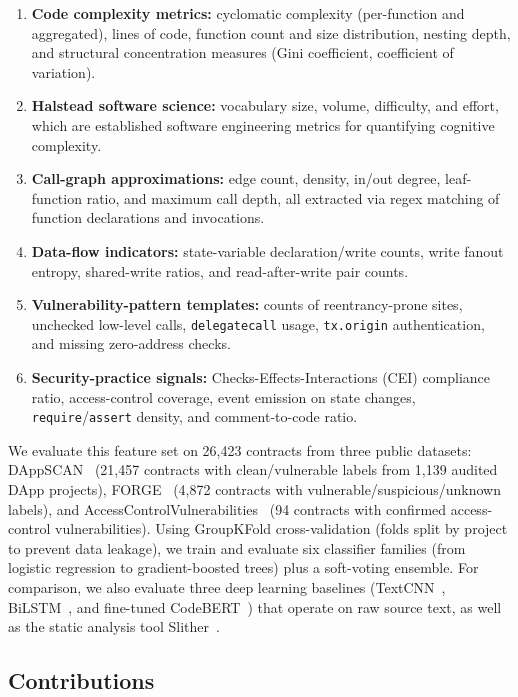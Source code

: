 \documentclass[11pt,a4paper]{article}
\begin{document}
\begin{enumerate}
    \item \textbf{Code complexity metrics:} cyclomatic complexity (per-function and aggregated), lines of code, function count and size distribution, nesting depth, and structural concentration measures (Gini coefficient, coefficient of variation).
    \item \textbf{Halstead software science:} vocabulary size, volume, difficulty, and effort, which are established software engineering metrics for quantifying cognitive complexity.
    \item \textbf{Call-graph approximations:} edge count, density, in/out degree, leaf-function ratio, and maximum call depth, all extracted via regex matching of function declarations and invocations.
    \item \textbf{Data-flow indicators:} state-variable declaration/write counts, write fanout entropy, shared-write ratios, and read-after-write pair counts.
    \item \textbf{Vulnerability-pattern templates:} counts of reentrancy-prone sites, unchecked low-level calls, \texttt{delegatecall} usage, \texttt{tx.origin} authentication, and missing zero-address checks.
    \item \textbf{Security-practice signals:} Checks-Effects-Interactions (CEI) compliance ratio, access-control coverage, event emission on state changes, \texttt{require}/\texttt{assert} density, and comment-to-code ratio.
\end{enumerate}

We evaluate this feature set on 26,423 contracts from three public datasets: DAppSCAN~\cite{wu2023dappscan} (21,457 contracts with clean/vulnerable labels from 1,139 audited DApp projects), FORGE~\cite{chen2025forge} (4,872 contracts with vulnerable/suspicious/unknown labels), and AccessControlVulnerabilities~\cite{liu2025acbenchmark} (94 contracts with confirmed access-control vulnerabilities).
Using GroupKFold cross-validation (folds split by project to prevent data leakage), we train and evaluate six classifier families (from logistic regression to gradient-boosted trees) plus a soft-voting ensemble.
For comparison, we also evaluate three deep learning baselines (TextCNN~\cite{kim2014convolutional}, BiLSTM~\cite{hochreiter1997long}, and fine-tuned CodeBERT~\cite{feng2020codebert}) that operate on raw source text, as well as the static analysis tool Slither~\cite{feist2019slither}.

\subsection{Contributions}
\end{document}
